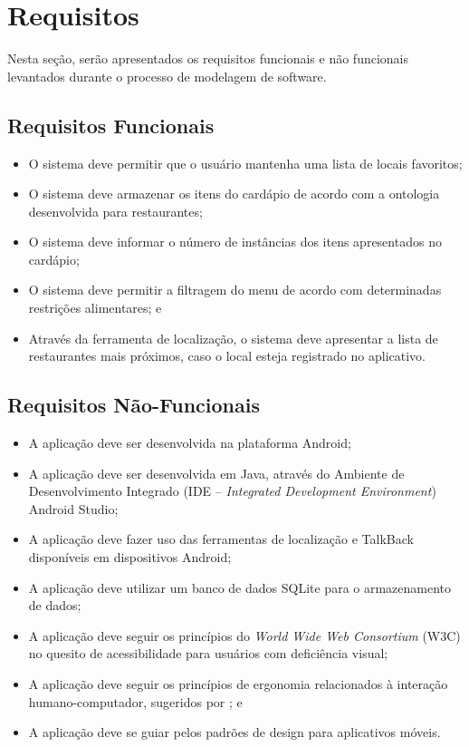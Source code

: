 \chapter{\label{chap:requi}Requisitos}
Nesta seção, serão apresentados os requisitos funcionais e não funcionais levantados durante o processo de modelagem de software.

\section{Requisitos Funcionais}
\begin{itemize}
    \item O sistema deve permitir que o usuário mantenha uma lista de locais favoritos;
    \item O sistema deve armazenar os itens do cardápio de acordo com a ontologia desenvolvida para restaurantes;
    \item O sistema deve informar o número de instâncias dos itens apresentados no cardápio;
    \item O sistema deve permitir a filtragem do menu de acordo com determinadas restrições alimentares; e
    \item Através da ferramenta de localização, o sistema deve apresentar a lista de restaurantes mais próximos, caso o local esteja registrado no aplicativo.
\end{itemize}

\section{Requisitos Não-Funcionais}
\begin{itemize}
    \item A aplicação deve ser desenvolvida na plataforma Android;
    \item A aplicação deve ser desenvolvida em Java, através do Ambiente de Desenvolvimento Integrado (IDE -- \emph{Integrated Development Environment}) Android Studio;
    \item A aplicação deve fazer uso das ferramentas de localização e TalkBack disponíveis em dispositivos Android;
    \item A aplicação deve utilizar um banco de dados SQLite para o armazenamento de dados;
    \item A aplicação deve seguir os princípios do \emph{World Wide Web Consortium} (W3C) no quesito de acessibilidade para usuários com deficiência visual;
    \item A aplicação deve seguir os princípios de ergonomia relacionados à interação humano-computador, sugeridos por \cite{ERGO2015}; e
    \item A aplicação deve se guiar pelos padrões de design para aplicativos móveis.
\end{itemize}